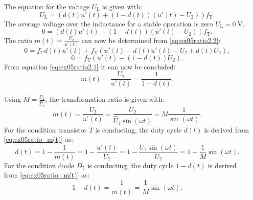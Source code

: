 \begin{solutionblock}
    The equation for the voltage $U_{\mathrm{L}}$ is given with:
    \begin{equation}
        U_{\mathrm{L}} = (d(t) u'(t) + (1-d(t))(u'(t)-U_{\mathrm{2}}))f_\mathrm{T}. 
    \end{equation}
The average voltage over the inductance for a stable operation is zero $U_{\mathrm{L}} = \SI{0}{\volt}$. 
    \begin{equation}
    0 = (d(t) u'(t) + (1-d(t))(u'(t)-U_{\mathrm{2}}))f_\mathrm{T}. \label{eq:ex05ratio2.2}
    \end{equation}   
The ratio $m(t)= \frac{U_\mathrm{2}}{u'(t)}$ can now be determined from \eqref{eq:ex05ratio2.2}: 
  \begin{equation}
    0 = f_\mathrm{T}d(t)u'(t)+f_\mathrm{T}(u'(t)-d(t)u'(t)-U_{\mathrm{2}}+d(t)U_{\mathrm{2}}),
  \end{equation}
  \begin{equation}
    0 = f_\mathrm{T}(u'(t)-(1-d(t))U_{\mathrm{2}}).\label{eq:ex05ratio2.1}
  \end{equation}
  From equation \eqref{eq:ex05ratio2.1} it can now be concluded:
  \begin{equation}
    m(t) = \frac{U_{\mathrm{2}}}{u'(t)}=\frac{1}{1-d(t)}. \label{eq:ex05ratio_m(t)}
  \end{equation}
\end{solutionblock}

\begin{solutionblock}
    Using $M = \frac{U_{\mathrm{2}}}{\hat U_{\mathrm{1}}}$, the transformation ratio is given with:
    \begin{equation}
        m(t) = \frac{U_{\mathrm{2}}}{u'(t)}=\frac{U_{\mathrm{2}}}{\hat U_{\mathrm{1}} \sin(\omega t)} = M \frac{1}{\sin(\omega t)}.
    \end{equation}
    For the condition transistor $T$ is conducting, the duty cycle $d(t)$ is derived from \eqref{eq:ex05ratio_m(t)} as:
\begin{equation}
    d(t) = 1-\frac{1}{m(t)} = 1- \frac{u'(t)}{U_{\mathrm{2}}}=1- \frac{U_{\mathrm{1}}\sin(\omega t)}{U_{\mathrm{2}}} = 1 -\frac{1}{M} \sin(\omega t).
\end{equation}
For the condition diode $D_{\mathrm{5}}$ is conducting, the duty cycle $1-d(t)$ is derived from \eqref{eq:ex05ratio_m(t)} as:
\begin{equation}
    1-d(t) = \frac{1}{m(t)}=\frac{1}{M} \sin(\omega t).
\end{equation}
\end{solutionblock}

